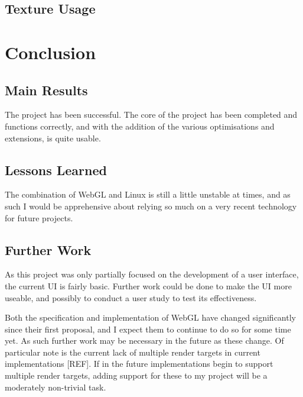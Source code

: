 \documentclass[12pt,twoside,notitlepage]{report}
\begin{document}
\section{Texture Usage}

\cleardoublepage
\chapter{Conclusion}

\section{Main Results}
The project has been successful. The core of the project has been completed and functions correctly, and with the addition of the various optimisations and extensions, is quite usable.

\section{Lessons Learned}
The combination of WebGL and Linux is still a little unstable at times, and as such I would be apprehensive about relying so much on a very recent technology for future projects.

\section{Further Work}
As this project was only partially focused on the development of a user interface, the current UI is fairly basic. Further work could be done to make the UI more useable, and possibly to conduct a user study to test its effectiveness.

Both the specification and implementation of WebGL have changed significantly since their first proposal, and I expect them to continue to do so for some time yet. As such further work may be necessary in the future as these change. Of particular note is the current lack of multiple render targets in current implementations [REF]. If in the future implementations begin to support multiple render targets, adding support for these to my project will be a moderately non-trivial task.

\cleardoublepage



\cleardoublepage

\appendix
\end{document}
